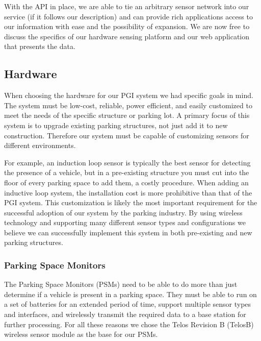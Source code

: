 \documentclass{acm_proc}
\begin{document}
With the API in place, we are able to tie an arbitrary sensor network into
our service (if it follows our description) and can provide rich
applications access to our information with ease and the possibility of
expansion.
We are now free to discuss the specifics of our hardware sensing platform
and our web application that presents the data.

\subsection{Hardware}

When choosing the hardware for our PGI system we had specific goals in mind.
The system must be low-cost, reliable, power efficient, and easily
customized to meet the needs of the specific structure or parking lot.
A primary focus of this system is to upgrade existing parking structures, not just add it to new construction.
Therefore our system must be capable of customizing sensors for different
environments.

For example, an induction loop sensor is typically the best sensor for
detecting the presence of a vehicle, but in a pre-existing structure you
must cut into the ﬂoor of every parking space to add them, a costly
procedure.
When adding an inductive loop system, the installation cost is more prohibitive
than that of the PGI system.
This customization is likely the most important requirement for the successful
adoption of our system by the parking industry.
By using wireless technology and supporting many different sensor types and
configurations we believe we can successfully implement this system in both
pre-existing and new parking structures.

\subsubsection{Parking Space Monitors}

The Parking Space Monitors (PSMs) need to be able to do more than just determine
if a vehicle is present in a parking space.
They must be able to run on a set of batteries for an extended period of
time, support multiple sensor types and interfaces, and wirelessly transmit
the required data to a base station for further processing.
For all these reasons we chose the Telos Revision B (TelosB) wireless
sensor module as the base for our PSMs.
\end{document}
